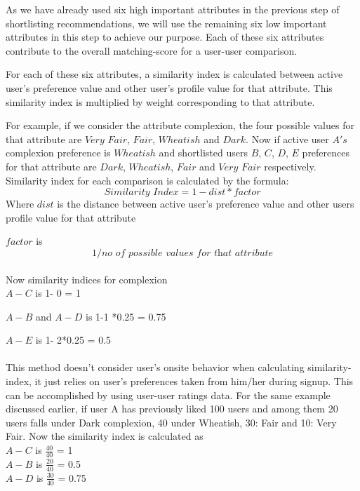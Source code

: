 \documentclass[12pt,oneside]{book}
\begin{document}
As we have already used six high important attributes in the previous step of shortlisting recommendations, we will use the remaining six low important attributes in this step to achieve our purpose. Each of these six attributes contribute to the overall matching-score for a user-user comparison. 

For each of these six attributes, a similarity index is calculated between active user's preference value and other user's profile value for that attribute. This similarity index is multiplied by weight corresponding to that attribute.

For example, if we consider the attribute complexion, the four possible values for that attribute are $Very$ $Fair$, $Fair$, $Wheatish$ and $Dark$. Now if active user $A's$ complexion preference is $Wheatish$ and shortlisted users $B$, $C$, $D$, $E$ preferences for that attribute are $Dark$, $Wheatish$, $Fair$ and $Very$ $Fair$ respectively. Similarity index for each comparison is calculated by the formula:
	\[\textit{Similarity Index} = 1-dist * factor\]
Where $ dist$ is the distance between active user's preference value and other users profile value for that attribute

$factor$ is \[1/\textit{no of possible values for that attribute}\]\\
Now similarity indices for complexion\\

$A-C$ is 1- 0 = 1

$A-B$ and $A-D$ is 1-1 *0.25 = 0.75

$A-E$ is 1- 2*0.25 = 0.5\\\\
This method doesn't consider user's onsite behavior when calculating similarity-index, it just relies on user's preferences taken from him/her during signup. This can be accomplished by using user-user ratings data. For the same example discussed earlier, if user A has previously liked 100 users and among them 20 users falls under Dark complexion, 40 under Wheatish, 30: Fair and 10: Very Fair. Now the similarity index is calculated as\\

$A-C$ is \(\displaystyle \frac{40}{40} \) = 1\\

$A-B$ is \(\displaystyle \frac{20}{40} \) = 0.5\\

$A-D$ is \(\displaystyle \frac{30}{40} \)  = 0.75\\
\end{document}

